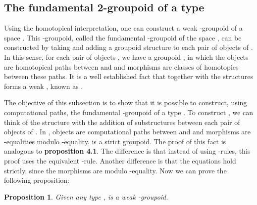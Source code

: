 \documentclass[12pt, a4paper,  oneside, headinclude,footinclude, BCOR5mm]{scrartcl}
\newtheorem{proposition}{Proposition}[section]
\begin{document}
\subsection{The fundamental 2-groupoid  of a type}

Using the homotopical interpretation, one can construct a weak -groupoid of a space . This -groupoid, called the fundamental -groupoid of the space , can be constructed by taking  and adding a groupoid structure to each pair of objects of . In this sense, for each pair of objects , we have a groupoid , in which the objects are homotopical paths between  and  and morphisms are classes of homotopies between these paths. It is a well established fact that  together with the structures  forms a weak , known as  \cite{Tom}.

The objective of this subsection is to show that it is possible to construct, using computational paths, the fundamental -groupoid  of a type . To construct , we can think of the structure  with the addition of substructures  between each pair of objects of . In , objects are computational paths between  and  and morphisms are -equalities modulo -equality.  is a strict groupoid. The proof of this fact is analogous to \textbf{proposition 4.1}. The difference is that instead of using -rules, this proof uses the equivalent -rule. Another difference is that the equations hold strictly, since the morphisms are modulo -equality. Now we can prove the following proposition:

\begin{proposition}

Given any type ,  is a weak -groupoid.

\end{proposition}
\end{document}
